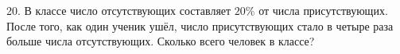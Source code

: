 20. В классе число отсутствующих составляет $20\%$ от числа присутствующих. После того, как один ученик ушёл, число присутствующих стало в четыре раза больше числа отсутствующих. Сколько всего человек в классе?\\
